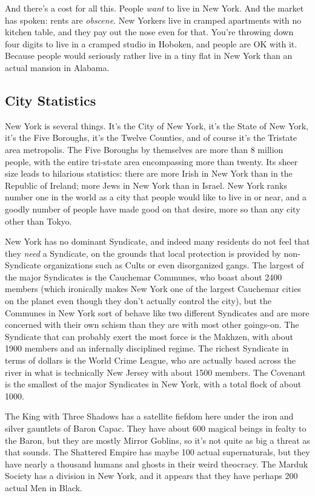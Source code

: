 And there's a cost for all this. People \textit{want} to live in New York. And the market has spoken: rents are \textit{obscene}. New Yorkers live in cramped apartments with no kitchen table, and they pay out the nose even for that. You're throwing down four digits to live in a cramped studio in Hoboken, and people are OK with it. Because people would seriously rather live in a tiny flat in New York than an actual mansion in Alabama.

\subsection{City Statistics}

\hspace{\parindent} New York is several things. It's the City of New York, it's the State of New York, it's the Five Boroughs, it's the Twelve Counties, and of course it's the Tristate area metropolis. The Five Boroughs by themselves are more than 8 million people, with the entire tri-state area encompassing more than twenty. Its sheer size leads to hilarious statistics: there are more Irish in New York than in the Republic of Ireland; more Jews in New York than in Israel. New York ranks number one in the world as a city that people would like to live in or near, and a goodly number of people have made good on that desire, more so than any city other than Tokyo.

New York has no dominant Syndicate, and indeed many residents do not feel that they \textit{need} a Syndicate, on the grounds that local protection is provided by non-Syndicate organizations such as Cults or even disorganized gangs. The largest of the major Syndicates is the Cauchemar Communes, who boast about 2400 members (which ironically makes New York one of the largest Cauchemar cities on the planet even though they don't actually control the city), but the Communes in New York sort of behave like two different Syndicates and are more concerned with their own schism than they are with most other goings-on. The Syndicate that can probably exert the most force is the Makhzen, with about 1900 members and an infernally disciplined regime. The richest Syndicate in terms of dollars is the World Crime League, who are actually based across the river in what is technically New Jersey with about 1500 members. The Covenant is the smallest of the major Syndicates in New York, with a total flock of about 1000.

The King with Three Shadows has a satellite fiefdom here under the iron and silver gauntlets of Baron Capac. They have about 600 magical beings in fealty to the Baron, but they are mostly Mirror Goblins, so it's not quite as big a threat as that sounds. The Shattered Empire has maybe 100 actual supernaturals, but they have nearly a thousand humans and ghosts in their weird theocracy. The Marduk Society has a division in New York, and it appears that they have perhaps 200 actual Men in Black.

